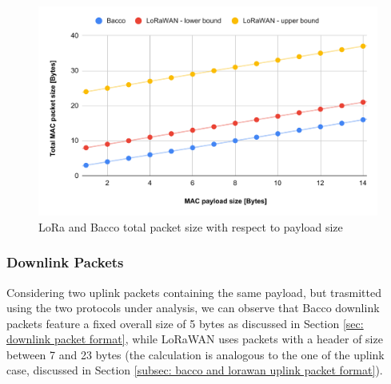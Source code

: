 \begin{figure}[ht]
    \centering
    \includegraphics[width=1.0\textwidth]{images/uplink_packet_size.pdf}
    \caption{LoRa and Bacco total packet size with respect to payload size}
    \label{img: uplink packet size}
\end{figure}


\subsubsection{Downlink Packets}
Considering two uplink packets containing the same payload, but trasmitted using the two protocols under analysis, we
can observe that Bacco downlink packets feature a fixed overall size of 5 bytes as discussed in Section \ref{sec:
downlink packet format}, while LoRaWAN uses packets with a header of size between 7 and 23 bytes (the
calculation is analogous to the one of the uplink case, discussed in Section \ref{subsec: bacco and lorawan uplink
packet format}).
